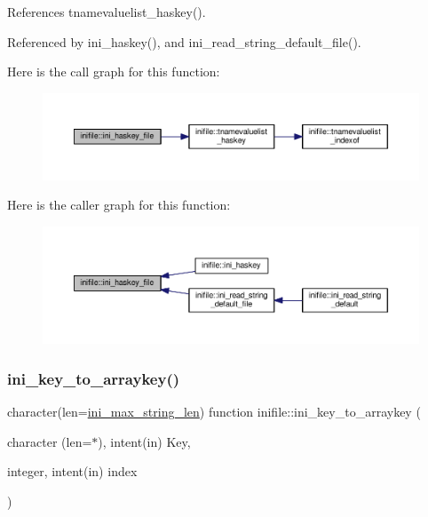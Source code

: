 References tnamevaluelist\+\_\+haskey().



Referenced by ini\+\_\+haskey(), and ini\+\_\+read\+\_\+string\+\_\+default\+\_\+file().

Here is the call graph for this function\+:
\nopagebreak
\begin{figure}[H]
\begin{center}
\leavevmode
\includegraphics[width=350pt]{namespaceinifile_afa65465f4a06b9d51b12e74038f77132_cgraph}
\end{center}
\end{figure}
Here is the caller graph for this function\+:
\nopagebreak
\begin{figure}[H]
\begin{center}
\leavevmode
\includegraphics[width=350pt]{namespaceinifile_afa65465f4a06b9d51b12e74038f77132_icgraph}
\end{center}
\end{figure}
\mbox{\label{namespaceinifile_a41a20dc9e9ec4315613c4e3c23108f2e}} 
\subsubsection{\texorpdfstring{ini\+\_\+key\+\_\+to\+\_\+arraykey()}{ini\_key\_to\_arraykey()}}
{\footnotesize\ttfamily character(len=\mbox{\hyperlink{namespaceinifile_a32faebf83b580d14b5af965dcb4eebfd}{ini\+\_\+max\+\_\+string\+\_\+len}}) function inifile\+::ini\+\_\+key\+\_\+to\+\_\+arraykey (\begin{DoxyParamCaption}\item[{character (len=$\ast$), intent(in)}]{Key,  }\item[{integer, intent(in)}]{index }\end{DoxyParamCaption})}



